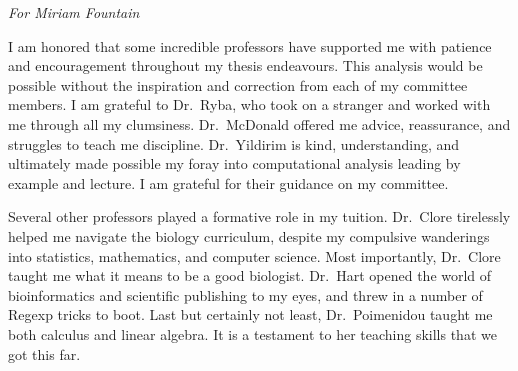 
\begin{dedication}
  \textit{For Miriam Fountain}
\end{dedication}

\begin{acknowledgements}
I am honored that some incredible professors have supported me with patience and encouragement throughout my thesis endeavours. This
analysis would be possible without the inspiration and correction from each of my committee members.  I am grateful to
Dr.\ Ryba, who took on a stranger and worked with me through all my clumsiness.  Dr.\ McDonald offered me advice,
reassurance, and struggles to teach me discipline.  Dr.\ Yildirim is kind, understanding, and ultimately made possible my foray
into computational analysis leading by example and lecture.  I am grateful for their guidance on my committee.

Several other professors played a formative role in my tuition.  Dr.\ Clore tirelessly helped me navigate the biology curriculum, despite
my compulsive wanderings into statistics, mathematics, and computer science.  Most importantly, Dr.\ Clore taught me what it means to be
a good biologist.  Dr.\ Hart opened the world of bioinformatics and scientific publishing to my eyes, and threw in a number of Regexp tricks
to boot.  Last but certainly not least, Dr.\ Poimenidou taught me both calculus and linear algebra.  It is a testament to her teaching
skills that we got this far.
\end{acknowledgements}
